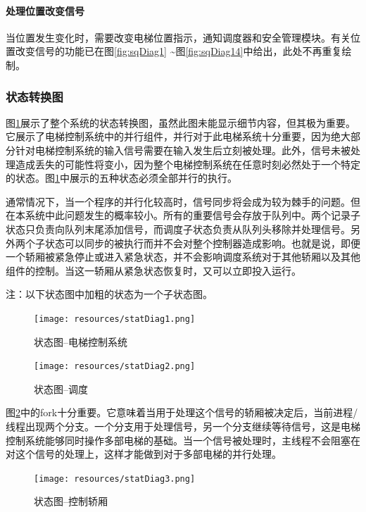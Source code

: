 \paragraph{处理位置改变信号}
当位置发生变化时，需要改变电梯位置指示，通知调度器和安全管理模块。有关位置改变信号的功能已在图\ref{fig:sqDiag1} \textasciitilde 图\ref{fig:sqDiag14}中给出，此处不再重复绘制。

\begin{minipage}{\textwidth}
\subsubsection{状态转换图}
\label{sec:briefStatDiag}
图\ref{fig:statDiag1}展示了整个系统的状态转换图，虽然此图未能显示细节内容，但其极为重要。它展示了电梯控制系统中的并行组件，并行对于此电梯系统十分重要，因为绝大部分针对电梯控制系统的输入信号需要在输入发生后立刻被处理。此外，信号未被处理造成丢失的可能性将变小，因为整个电梯控制系统在任意时刻必然处于一个特定的状态。图\ref{fig:statDiag1}中展示的五种状态必须全部并行的执行。\par

通常情况下，当一个程序的并行化较高时，信号同步将会成为较为棘手的问题。但在本系统中此问题发生的概率较小。所有的重要信号会存放于队列中。两个记录子状态只负责向队列末尾添加信号，而调度子状态负责从队列头移除并处理信号。另外两个子状态可以同步的被执行而并不会对整个控制器造成影响。也就是说，即便一个轿厢被紧急停止或进入紧急状态，并不会影响调度系统对于其他轿厢以及其他组件的控制。当这一轿厢从紧急状态恢复时，又可以立即投入运行。 \par

注：以下状态图中加粗的状态为一个子状态图。
\begin{figure}[H]
	\centering
	\texttt{[image: resources/statDiag1.png]}
	\caption{状态图--电梯控制系统}
	\label{fig:statDiag1}
\end{figure}
\end{minipage}

\begin{figure}[H]
	\centering
	\texttt{[image: resources/statDiag2.png]}
	\caption{状态图--调度}
	\label{fig:statDiag2}
\end{figure}
图\ref{fig:statDiag2}中的fork十分重要。它意味着当用于处理这个信号的轿厢被决定后，当前进程/线程出现两个分支。一个分支用于处理信号，另一个分支继续等待信号，这是电梯控制系统能够同时操作多部电梯的基础。当一个信号被处理时，主线程不会阻塞在对这个信号的处理上，这样才能做到对于多部电梯的并行处理。

\begin{figure}[H]
	\centering
	\texttt{[image: resources/statDiag3.png]}
	\caption{状态图--控制轿厢}
	\label{fig:statDiag3}
\end{figure}

